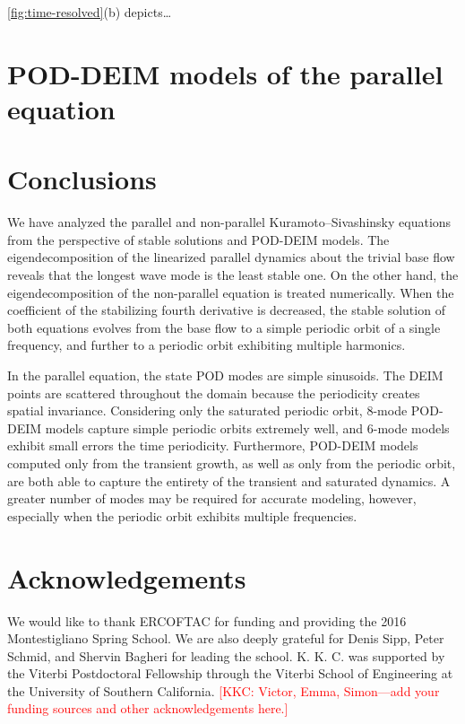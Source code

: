 \documentclass[11pt]{article}
\newcommand{\KSE}{Kuramoto--Sivashinsky equation}
\newcommand{\kkc}[1]{\textcolor{red}{[KKC: #1]}}
\begin{document}
\autoref{fig:time-resolved}(b) depicts\ldots

\section{POD-DEIM models of the parallel equation}
\label{sec:pod-deim}

\section{Conclusions}
\label{sec:conclusions}

We have analyzed the parallel and non-parallel {\KSE}s from the perspective of stable solutions and POD-DEIM models.
The eigendecomposition of the linearized parallel dynamics about the trivial base flow reveals that the longest wave mode is the least stable one.
On the other hand, the eigendecomposition of the non-parallel equation is treated numerically.
When the coefficient of the stabilizing fourth derivative is decreased, the stable solution of both equations evolves from the base flow to a simple periodic orbit of a single frequency, and further to a periodic orbit exhibiting multiple harmonics.

In the parallel equation, the state POD modes are simple sinusoids.
The DEIM points are scattered throughout the domain because the periodicity creates spatial invariance.
Considering only the saturated periodic orbit, 8-mode POD-DEIM models capture simple periodic orbits extremely well, and 6-mode models exhibit small errors the time periodicity.
Furthermore, POD-DEIM models computed only from the transient growth, as well as only from the periodic orbit, are both able to capture the entirety of the transient and saturated dynamics.
A greater number of modes may be required for accurate modeling, however, especially when the periodic orbit exhibits multiple frequencies.

\section{Acknowledgements}

We would like to thank ERCOFTAC for funding and providing the 2016 Montestigliano Spring School.
We are also deeply grateful for Denis Sipp, Peter Schmid, and Shervin Bagheri for leading the school.
K. K. C. was supported by the Viterbi Postdoctoral Fellowship through the Viterbi School of Engineering at the University of Southern California.
\kkc{Victor, Emma, Simon---add your funding sources and other acknowledgements here.}


\end{document}

